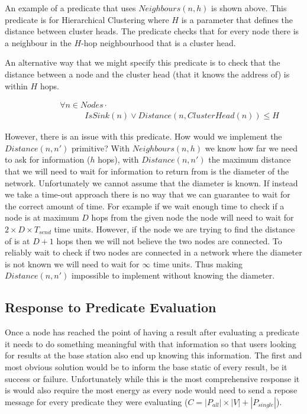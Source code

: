 An example of a predicate that uses $Neighbours(n, h)$ is shown above. This predicate is for Hierarchical Clustering where $H$ is a parameter that defines the distance between cluster heads. The predicate checks that for every node there is a neighbour in the $H$-hop neighbourhood that is a cluster head.

An alternative way that we might specify this predicate is to check that the distance between a node and the cluster head (that it knows the address of) is within $H$ hops.

\begin{align}
\label{eq:hcluster-distance-predicate}
& \hspace{3em}	\forall n \in Nodes \cdot \\
& \hspace{6em}		IsSink(n) \lor Distance(n, ClusterHead(n)) \leq H
\end{align}

However, there is an issue with this predicate. How would we implement the $Distance(n, n')$ primitive? With $Neighbours(n, h)$ we know how far we need to ask for information ($h$ hops), with $Distance(n, n')$ the maximum distance that we will need to wait for information to return from is the diameter of the network. Unfortunately we cannot assume that the diameter is known. If instead we take a time-out approach there is no way that we can guarantee to wait for the correct amount of time. For example if we wait enough time to check if a node is at maximum $D$ hops from the given node the node will need to wait for $2 \times D \times T_{send}$ time units. However, if the node we are trying to find the distance of is at $D + 1 $ hops then we will not believe the two nodes are connected. To reliably wait to check if two nodes are connected in a network where the diameter is not known we will need to wait for $\infty$ time units. Thus making $Distance(n, n')$ impossible to implement without knowing the diameter.


\subsection{Response to Predicate Evaluation}

Once a node has reached the point of having a result after evaluating a predicate it needs to do something meaningful with that information so that users looking for results at the base station also end up knowing this information. The first and most obvious solution would be to inform the base static of every result, be it success or failure. Unfortunately while this is the most comprehensive response it is would also require the most energy as every node would need to send a repose message for every predicate they were evaluating ($C = |P_{all}| \times |V| + |P_{single}|$).

